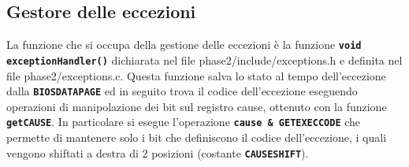 \documentclass{article}
\begin{document}
\subsection{Gestore delle eccezioni}
La funzione che si occupa della gestione delle eccezioni è la funzione \texttt{\textbf{void exceptionHandler()}} dichiarata 
nel file phase2/include/exceptions.h e definita nel file phase2/exceptions.c. Questa funzione salva lo stato al tempo dell'eccezione dalla \texttt{\textbf{BIOSDATAPAGE}} ed in seguito trova il codice dell'eccezione eseguendo operazioni di manipolazione dei bit sul registro cause, ottenuto con la funzione \texttt{\textbf{getCAUSE}}. In particolare si esegue l'operazione 
\texttt{\textbf{cause \& GETEXECCODE}} che permette di mantenere solo i bit che definiscono il codice dell'eccezione, i quali vengono shiftati a destra di 2 posizioni (costante \texttt{\textbf{CAUSESHIFT}}). 
\end{document}
